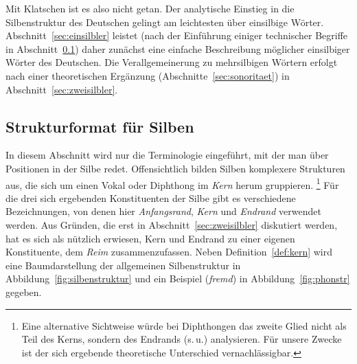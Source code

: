 
Mit Klatschen ist es also nicht getan.
Der analytische Einstieg in die Silbenstruktur des Deutschen gelingt am leichtesten über einsilbige Wörter.
Abschnitt~\ref{sec:einsilbler} leistet (nach der Einführung einiger technischer Begriffe in Abschnitt~\ref{sec:silbenstruktur}) daher zunächst eine einfache Beschreibung möglicher einsilbiger Wörter des Deutschen.
Die Verallgemeinerung zu mehrsilbigen Wörtern erfolgt nach einer theoretischen Ergänzung (Abschnitte~\ref{sec:sonoritaet}) in Abschnitt~\ref{sec:zweisilbler}.


\subsection{Strukturformat für Silben}

\label{sec:silbenstruktur}

In diesem Abschnitt wird nur die Terminologie eingeführt, mit der man über Positionen in der Silbe redet.
Offensichtlich bilden Silben komplexere Strukturen aus, die sich um einen Vokal oder Diphthong im \textit{Kern} herum gruppieren.%
\footnote{Eine alternative Sichtweise würde bei Diphthongen das zweite Glied nicht als Teil des Kerns, sondern des Endrands (s.\,u.) analysieren.
Für unsere Zwecke ist der sich ergebende theoretische Unterschied vernachlässigbar.}
Für die drei sich ergebenden Konstituenten der Silbe gibt es verschiedene Bezeichnungen, von denen hier \textit{Anfangsrand}, \textit{Kern} und \textit{Endrand} verwendet werden.
Aus Gründen, die erst in Abschnitt~\ref{sec:zweisilbler} diskutiert werden, hat es sich als nützlich erwiesen, Kern und Endrand zu einer eigenen Konstituente, dem \textit{Reim} zusammenzufassen.
Neben Definition~\ref{def:kern} wird eine Baumdarstellung der allgemeinen Silbenstruktur in Abbildung~\ref{fig:silbenstruktur} und ein Beispiel (\textit{fremd}) in Abbildung~\ref{fig:phonstr} gegeben.


